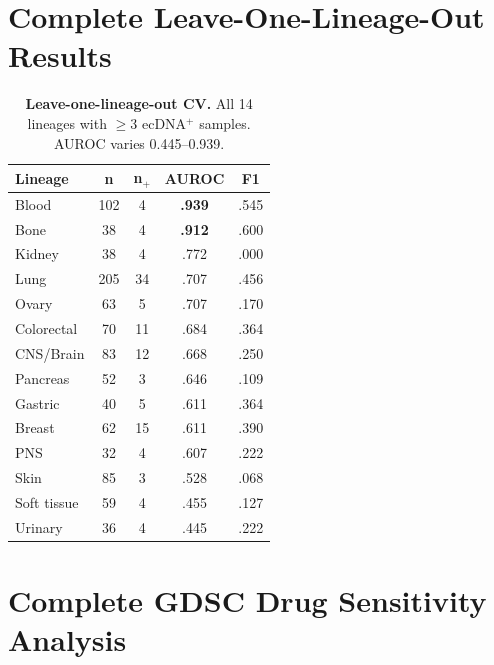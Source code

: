 \documentclass[sigconf,anonymous]{acmart}
\begin{document}
\section{Complete Leave-One-Lineage-Out Results}
\label{app:loocv}

\begin{table}[h]
\caption{\textbf{Leave-one-lineage-out CV.} All 14 lineages with $\geq$3 ecDNA$^+$ samples. AUROC varies 0.445--0.939.}
\label{tab:loocv_main}
\centering
\footnotesize
\begin{tabular}{@{}lcccc@{}}
\toprule
Lineage & n & n$_+$ & AUROC & F1 \\
\midrule
Blood & 102 & 4 & \textbf{.939} & .545 \\
Bone & 38 & 4 & \textbf{.912} & .600 \\
Kidney & 38 & 4 & .772 & .000 \\
Lung & 205 & 34 & .707 & .456 \\
Ovary & 63 & 5 & .707 & .170 \\
Colorectal & 70 & 11 & .684 & .364 \\
CNS/Brain & 83 & 12 & .668 & .250 \\
Pancreas & 52 & 3 & .646 & .109 \\
Gastric & 40 & 5 & .611 & .364 \\
Breast & 62 & 15 & .611 & .390 \\
PNS & 32 & 4 & .607 & .222 \\
Skin & 85 & 3 & .528 & .068 \\
Soft tissue & 59 & 4 & .455 & .127 \\
Urinary & 36 & 4 & .445 & .222 \\
\bottomrule
\end{tabular}
\end{table}


\section{Complete GDSC Drug Sensitivity Analysis}
\label{app:gdsc}
\end{document}
